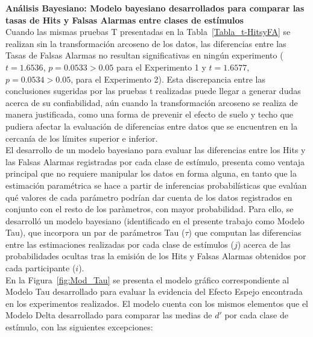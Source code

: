 \textbf{Análisis Bayesiano: Modelo bayesiano desarrollados para comparar las tasas de Hits y Falsas Alarmas entre clases de estímulos}\\

Cuando las mismas pruebas T presentadas en la Tabla~\ref{Tabla_t-HitsyFA} se realizan sin la transformación arcoseno de los datos, las diferencias entre las Tasas de Falsas Alarmas no resultan significativas en ningún experimento ($t=1.6536$, $p=0.0533>0.05$ para el Experimento 1 y $t=1.6577$, $p=0.0534>0.05$, para el Experimento 2). Esta discrepancia entre las conclusiones sugeridas por las pruebas t realizadas puede llegar a generar dudas acerca de su confiabilidad, aún cuando la transformación arcoseno se realiza de manera justificada, como una forma de prevenir el efecto de suelo y techo que pudiera afectar la evaluación de diferencias entre datos que se encuentren en la cercanía de los límites superior e inferior.\\

El desarrollo de un modelo bayesiano para evaluar las diferencias entre los Hits y las Falsas Alarmas registradas por cada clase de estímulo, presenta como ventaja principal que no requiere manipular los datos en forma alguna, en tanto que la estimación paramétrica se hace a partir de inferencias probabilísticas que evalúan qué valores de cada parámetro podrían dar cuenta de los datos registrados en conjunto con el resto de los paràmetros, con mayor probabilidad. Para ello, se desarrolló un modelo bayesiano (identificado en el presente trabajo como Modelo Tau), que incorpora un par de parámetros Tau ($\tau$) que computan las diferencias entre las estimaciones realizadas por cada clase de estímulos ($j$) acerca de las probabilidades ocultas tras la emisión de los Hits y Falsas Alarmas obtenidos por cada participante ($i$).\\ 

En la Figura~\ref{fig:Mod_Tau} se presenta el modelo gráfico correspondiente al Modelo Tau desarrollado para evaluar la evidencia del Efecto Espejo encontrada en los experimentos realizados. El modelo cuenta con los mismos elementos que el Modelo Delta desarrollado para comparar las medias de $d'$ por cada clase de estímulo, con las siguientes excepciones:\\

